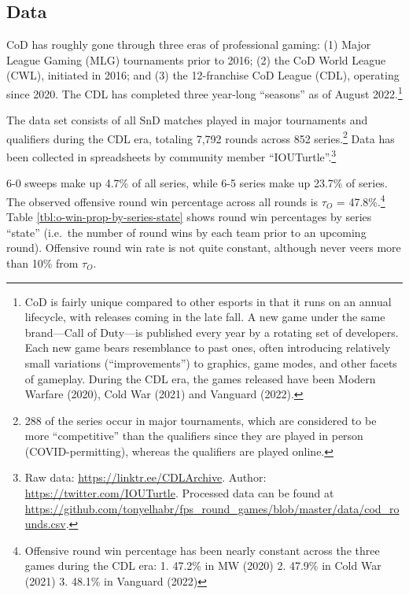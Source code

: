 \documentclass{article}
\begin{document}
\hypertarget{data}{%
\subsection{Data}\label{data}}

CoD has roughly gone through three eras of professional gaming: (1)
Major League Gaming (MLG) tournaments prior to 2016; (2) the CoD World
League (CWL), initiated in 2016; and (3) the 12-franchise CoD League
(CDL), operating since 2020. The CDL has completed three year-long
``seasons'' as of August 2022.\footnote{CoD is fairly unique compared to
  other esports in that it runs on an annual lifecycle, with releases
  coming in the late fall. A new game under the same brand---Call of
  Duty---is published every year by a rotating set of developers. Each
  new game bears resemblance to past ones, often introducing relatively
  small variations (``improvements'') to graphics, game modes, and other
  facets of gameplay. During the CDL era, the games released have been
  Modern Warfare (2020), Cold War (2021) and Vanguard (2022).}

The data set consists of all SnD matches played in major tournaments and
qualifiers during the CDL era, totaling 7,792 rounds across 852
series.\footnote{288 of the series occur in major tournaments, which are
  considered to be more ``competitive'' than the qualifiers since they
  are played in person (COVID-permitting), whereas the qualifiers are
  played online.} Data has been collected in spreadsheets by community
member ``IOUTurtle''.\footnote{Raw data:
  \url{https://linktr.ee/CDLArchive}. Author:
  \url{https://twitter.com/IOUTurtle}. Processed data can be found at
  \url{https://github.com/tonyelhabr/fps_round_games/blob/master/data/cod_rounds.csv}.}

6-0 sweeps make up 4.7\% of all series, while 6-5 series make up 23.7\%
of series. The observed offensive round win percentage across all rounds
is \(\tau_O\) = 47.8\%.\footnote{Offensive round win percentage has been
  nearly constant across the three games during the CDL era: 1. 47.2\%
  in MW (2020) 2. 47.9\% in Cold War (2021) 3. 48.1\% in Vanguard (2022)}
Table \ref{tbl:o-win-prop-by-series-state} shows round win percentages
by series ``state'' (i.e.~the number of round wins by each team prior to
an upcoming round). Offensive round win rate is not quite constant,
although never veers more than 10\% from \(\tau_O\).
\end{document}
